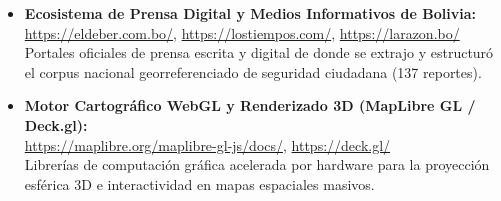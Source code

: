 \begin{itemize}
    \item \textbf{Ecosistema de Prensa Digital y Medios Informativos de Bolivia:}\\
    \url{https://eldeber.com.bo/}, \quad \url{https://lostiempos.com/}, \quad \url{https://larazon.bo/}\\
    Portales oficiales de prensa escrita y digital de donde se extrajo y estructuró el corpus nacional georreferenciado de seguridad ciudadana (137 reportes).
    
    \item \textbf{Motor Cartográfico WebGL y Renderizado 3D (MapLibre GL / Deck.gl):}\\
    \url{https://maplibre.org/maplibre-gl-js/docs/}, \quad \url{https://deck.gl/}\\
    Librerías de computación gráfica acelerada por hardware para la proyección esférica 3D e interactividad en mapas espaciales masivos.
\end{itemize}

